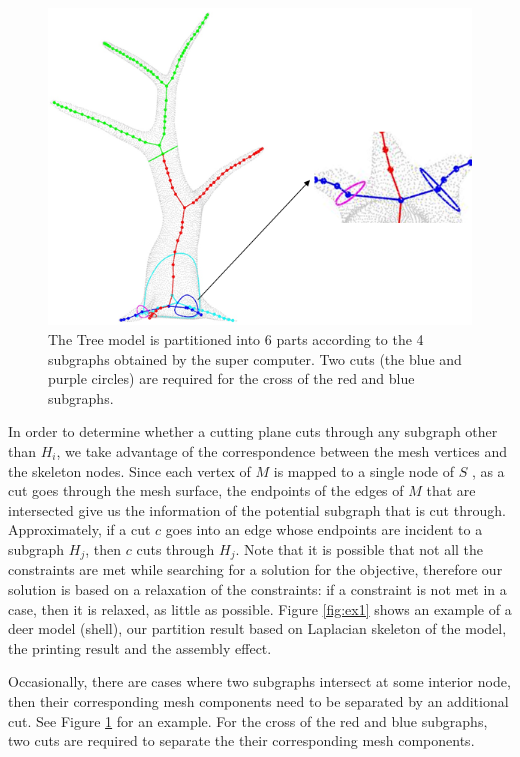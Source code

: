 \begin{figure}[t!]
  \centering
  \includegraphics[width=0.8\linewidth]{figs/super_tree.png}
  \caption{\label{fig:super_tree}%
  The Tree model is partitioned into 6 parts according to the 4 subgraphs obtained by the super computer. Two cuts (the blue and purple circles) are required for the cross of the red and blue subgraphs.}
\end{figure}

In order to determine whether a cutting plane cuts through any subgraph other than $H_i$, we take advantage of the correspondence between the mesh vertices and the skeleton nodes. Since each vertex of $M$ is mapped to a single node of $S$ \cite{AuTCCL08}, as a cut goes through the mesh surface, the endpoints of the edges of $M$ that are intersected give us the information of the potential subgraph that is cut through. Approximately, if a cut $c$ goes into an edge whose endpoints are incident to a subgraph $H_j$, then $c$ cuts through $H_j$. Note that it is possible that not all the constraints are met while searching for a solution for the objective, therefore our solution is based on a relaxation of the constraints: if a constraint is not met in a case, then it is relaxed, as little as possible. Figure \ref{fig:ex1} shows an example of a deer model (shell), our partition result based on Laplacian skeleton of the model, the printing result and the assembly effect.

{ {Occasionally, there are cases where two subgraphs intersect at some interior node, then their corresponding mesh components need to be separated by an additional cut.} {See Figure \ref{fig:super_tree} for an example. For the cross of the red and blue subgraphs, two cuts are required to separate the their corresponding mesh components. }}

